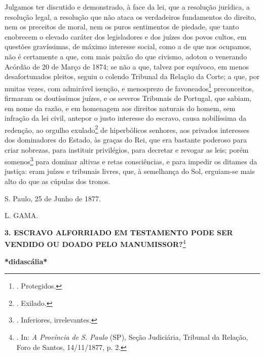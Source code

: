 Julgamos ter discutido e demonstrado, à face da lei, que a resolução
jurídica, a resolução legal, a resolução que não ataca os verdadeiros
fundamentos do direito, nem os preceitos de moral, nem os puros
sentimentos de piedade, que tanto enobrecem o elevado caráter dos
legisladores e dos juízes dos povos cultos, em questões gravíssimas, de
máximo interesse social, como a de que nos ocupamos, não é certamente a
que, com mais paixão do que civismo, adotou o venerando Acórdão de 20 de
Março de 1874; se não a que, talvez por equívoco, em menos
desafortunados pleitos, seguiu o colendo Tribunal da Relação da Corte; a
que, por muitas vezes, com admirável isenção, e menosprezo de
favoneados\footnote{. Protegidos.} preconceitos, firmaram os doutíssimos
juízes, e os severos Tribunais de Portugal, que sabiam, em nome da
razão, e em homenagem aos direitos naturais do homem, sem infração da
lei civil, antepor o justo interesse do escravo, causa nobilíssima da
redenção, ao orgulho exulado\footnote{. Exilado.} de hiperbólicos
senhores, aos privados interesses dos dominadores do Estado, às graças
do Rei, que era bastante poderoso para criar nobrezas, para instituir
privilégios, para decretar e revogar as leis; porém somenos\footnote{.
  Inferiores, irrelevantes.}
par\protect\hypertarget{Secao_Sem_Titulo-4}{}{}a dominar altivas e retas
consciências, e para impedir os ditames da justiça: eram juízes e
tribunais livres, que, à semelhança do Sol, erguiam-se mais alto do que
as cúpulas dos tronos.

S. Paulo, 25 de Junho de 1877.

L. GAMA.

\protect\hypertarget{Secao_Sem_Titulo-5}{}{}\textbf{3. ESCRAVO
ALFORRIADO EM TESTAMENTO PODE SER VENDIDO OU DOADO PELO
MANUMISSOR?}\footnote{. In: \emph{A Província de S. Paulo} (SP), Seção
  Judiciária, Tribunal da Relação, Foro de Santos, 14/11/1877, p. 2.}

\textbf{*didascália*}

